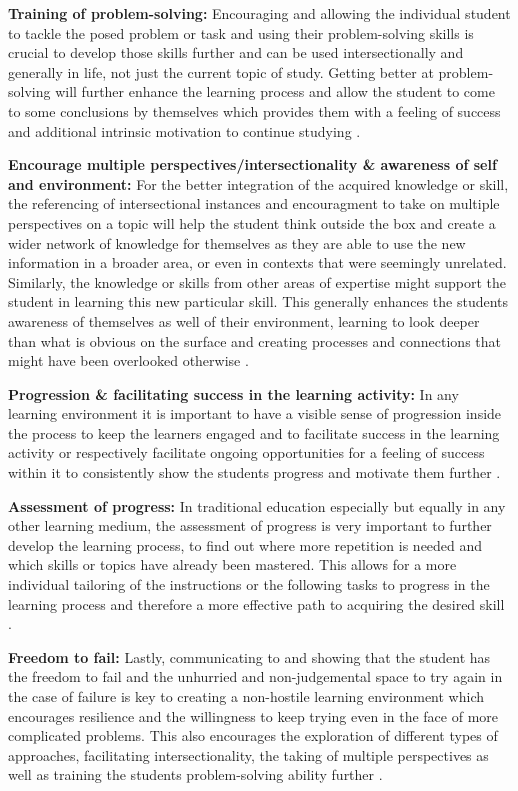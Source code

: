\textbf{Training of problem-solving:}
Encouraging and allowing the individual student to tackle the posed problem or task and using their problem-solving skills is crucial to develop those skills further and can be used intersectionally and generally in life, not just the current topic of study. Getting better at problem-solving will further enhance the learning process and allow the student to come to some conclusions by themselves which provides them with a feeling of success and additional intrinsic motivation to continue studying \cite{lifelong} \cite{online}.

\textbf{Encourage multiple perspectives/intersectionality \& awareness of self and environment:}
For the better integration of the acquired knowledge or skill, the referencing of intersectional instances and encouragment to take on multiple perspectives on a topic will help the student think outside the box and create a wider network of knowledge for themselves as they are able to use the new information in a broader area, or even in contexts that were seemingly unrelated. Similarly, the knowledge or skills from other areas of expertise might support the student in learning this new particular skill. This generally enhances the students awareness of themselves as well of their environment, learning to look deeper than what is obvious on the surface and creating processes and connections that might have been overlooked otherwise \cite{aspects}.

\textbf{Progression \& facilitating success in the learning activity:}
In any learning environment it is important to have a visible sense of progression inside the process to keep the learners engaged and to facilitate success in the learning activity or respectively facilitate ongoing opportunities for a feeling of success within it to consistently show the students progress and motivate them further \cite{fail} \cite{equilibrium}.

\textbf{Assessment of progress:}
In traditional education especially but equally in any other learning medium, the assessment of progress is very important to further develop the learning process, to find out where more repetition is needed and which skills or topics have already been mastered. This allows for a more individual tailoring of the instructions or the following tasks to progress in the learning process and therefore a more effective path to acquiring the desired skill \cite{online}.

\textbf{Freedom to fail:}
Lastly, communicating to and showing that the student has the freedom to fail and the unhurried and non-judgemental space to try again in the case of failure is key to creating a non-hostile learning environment which encourages resilience and the willingness to keep trying even in the face of more complicated problems. This also encourages the exploration of different types of approaches, facilitating intersectionality, the taking of multiple perspectives as well as training the students problem-solving ability further \cite{fail}.

